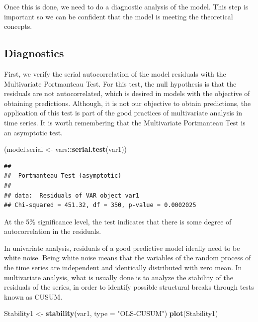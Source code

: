 \documentclass[
]{article}
\newenvironment{Shaded}{\begin{snugshade}}{\end{snugshade}}
\newcommand{\AttributeTok}[1]{\textcolor[rgb]{0.13,0.29,0.53}{#1}}
\newcommand{\FunctionTok}[1]{\textcolor[rgb]{0.13,0.29,0.53}{\textbf{#1}}}
\newcommand{\NormalTok}[1]{#1}
\newcommand{\OtherTok}[1]{\textcolor[rgb]{0.56,0.35,0.01}{#1}}
\newcommand{\SpecialCharTok}[1]{\textcolor[rgb]{0.81,0.36,0.00}{\textbf{#1}}}
\newcommand{\StringTok}[1]{\textcolor[rgb]{0.31,0.60,0.02}{#1}}
\renewenvironment{Shaded}{\begin{mdframed}[ backgroundcolor=shadecolor, linecolor = shadecolor, leftmargin=\dimexpr\leftmargin-2pt\relax, innerleftmargin=1.6pt, innertopmargin=5pt, skipabove=10pt,skipbelow=3pt ]}{\end{mdframed}}
\begin{document}
Once this is done, we need to do a diagnostic analysis of the model.
This step is important so we can be confident that the model is meeting
the theoretical concepts.

\subsection{Diagnostics}\label{diagnostics}

First, we verify the serial autocorrelation of the model residuals with
the Multivariate Portmanteau Test. For this test, the null hypothesis is
that the residuals are not autocorrelated, which is desired in models
with the objective of obtaining predictions. Although, it is not our
objective to obtain predictions, the application of this test is part of
the good practices of multivariate analysis in time series. It is worth
remembering that the Multivariate Portmanteau Test is an asymptotic
test.

\begin{Shaded}
\begin{Highlighting}[]
\NormalTok{(model.serial  }\OtherTok{\textless{}{-}}\NormalTok{ vars}\SpecialCharTok{::}\FunctionTok{serial.test}\NormalTok{(var1))}
\end{Highlighting}
\end{Shaded}

\begin{verbatim}
## 
##  Portmanteau Test (asymptotic)
## 
## data:  Residuals of VAR object var1
## Chi-squared = 451.32, df = 350, p-value = 0.0002025
\end{verbatim}

At the 5\% significance level, the test indicates that there is some
degree of autocorrelation in the residuals.

In univariate analysis, residuals of a good predictive model ideally
need to be white noise. Being white noise means that the variables of
the random process of the time series are independent and identically
distributed with zero mean. In multivariate analysis, what is usually
done is to analyze the stability of the residuals of the series, in
order to identify possible structural breaks through tests known as
CUSUM.

\begin{Shaded}
\begin{Highlighting}[]
\NormalTok{Stability1 }\OtherTok{\textless{}{-}} \FunctionTok{stability}\NormalTok{(var1, }\AttributeTok{type =} \StringTok{"OLS{-}CUSUM"}\NormalTok{)}
\FunctionTok{plot}\NormalTok{(Stability1)}
\end{Highlighting}
\end{Shaded}
\end{document}
